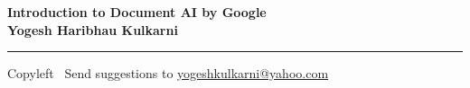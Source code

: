 
\graphicspath{{images/}}

\footnotesize


\begin{center}
\Large{\textbf{Introduction to Document AI by Google\\ Yogesh Haribhau Kulkarni}}  
\end{center}

\begin{multicols}{2}

\end{multicols}

\rule{\linewidth}{0.25pt}
\scriptsize
Copyleft \textcopyleft\  Send suggestions to 
\href{http://www.yogeshkulkarni.com}{yogeshkulkarni@yahoo.com}



